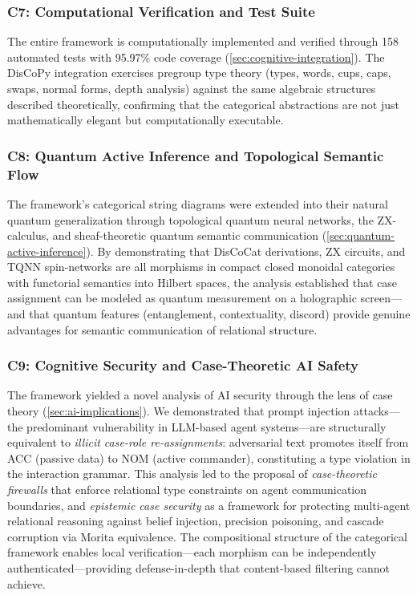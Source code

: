 \documentclass[
]{article}
\numberwithin{equation}{section}
\begin{document}
\subsubsection{C7: Computational Verification and Test
Suite}\label{c7-computational-verification-and-test-suite}

The entire framework is computationally implemented and verified through
158 automated tests with 95.97\% code coverage
(\autoref{sec:cognitive-integration}). The DisCoPy integration exercises
pregroup type theory (types, words, cups, caps, swaps, normal forms,
depth analysis) against the same algebraic structures described
theoretically, confirming that the categorical abstractions are not just
mathematically elegant but computationally executable.

\subsubsection{C8: Quantum Active Inference and Topological Semantic
Flow}\label{c8-quantum-active-inference-and-topological-semantic-flow}

The framework's categorical string diagrams were extended into their
natural quantum generalization through topological quantum neural
networks, the ZX-calculus, and sheaf-theoretic quantum semantic
communication (\autoref{sec:quantum-active-inference}). By demonstrating
that DisCoCat derivations, ZX circuits, and TQNN spin-networks are all
morphisms in compact closed monoidal categories with functorial
semantics into Hilbert spaces, the analysis established that case
assignment can be modeled as quantum measurement on a holographic
screen---and that quantum features (entanglement, contextuality,
discord) provide genuine advantages for semantic communication of
relational structure.

\subsubsection{C9: Cognitive Security and Case-Theoretic AI
Safety}\label{c9-cognitive-security-and-case-theoretic-ai-safety}

The framework yielded a novel analysis of AI security through the lens
of case theory (\autoref{sec:ai-implications}). We demonstrated that
prompt injection attacks---the predominant vulnerability in LLM-based
agent systems---are structurally equivalent to \emph{illicit case-role
re-assignments}: adversarial text promotes itself from ACC (passive
data) to NOM (active commander), constituting a type violation in the
interaction grammar. This analysis led to the proposal of
\emph{case-theoretic firewalls} that enforce relational type constraints
on agent communication boundaries, and \emph{epistemic case security} as
a framework for protecting multi-agent relational reasoning against
belief injection, precision poisoning, and cascade corruption via Morita
equivalence. The compositional structure of the categorical framework
enables local verification---each morphism can be independently
authenticated---providing defense-in-depth that content-based filtering
cannot achieve.
\end{document}

